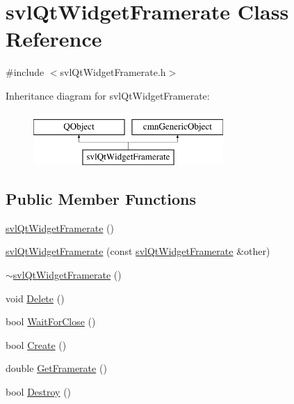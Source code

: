 \hypertarget{classsvl_qt_widget_framerate}{\section{svl\-Qt\-Widget\-Framerate Class Reference}
\label{classsvl_qt_widget_framerate}
}


{\ttfamily \#include $<$svl\-Qt\-Widget\-Framerate.\-h$>$}

Inheritance diagram for svl\-Qt\-Widget\-Framerate\-:\begin{figure}[H]
\begin{center}
\leavevmode
\includegraphics[height=2.000000cm]{d0/dd1/classsvl_qt_widget_framerate}
\end{center}
\end{figure}
\subsection*{Public Member Functions}
\begin{DoxyCompactItemize}
\item 
\hyperlink{classsvl_qt_widget_framerate_a46ce5fabc690f1cd4be48bce5a9a14c0}{svl\-Qt\-Widget\-Framerate} ()
\item 
\hyperlink{classsvl_qt_widget_framerate_a35bfc2e11d1940e4a20fb0893ae43544}{svl\-Qt\-Widget\-Framerate} (const \hyperlink{classsvl_qt_widget_framerate}{svl\-Qt\-Widget\-Framerate} \&other)
\item 
\hyperlink{classsvl_qt_widget_framerate_a3296abfae896799ad64bb4455b86a6c2}{$\sim$svl\-Qt\-Widget\-Framerate} ()
\item 
void \hyperlink{classsvl_qt_widget_framerate_a071273cf779afa3c38d85060a24cd4ad}{Delete} ()
\item 
bool \hyperlink{classsvl_qt_widget_framerate_aaa825b90f6192607e299e3d6d18dac07}{Wait\-For\-Close} ()
\item 
bool \hyperlink{classsvl_qt_widget_framerate_a84b2fa8da2774c1c2f9877660c998e65}{Create} ()
\item 
double \hyperlink{classsvl_qt_widget_framerate_aa66b1c470b5148c3c24060b311d45764}{Get\-Framerate} ()
\item 
bool \hyperlink{classsvl_qt_widget_framerate_ac6b9acb24c686d5f0e664e8b736d705b}{Destroy} ()
\end{DoxyCompactItemize}
